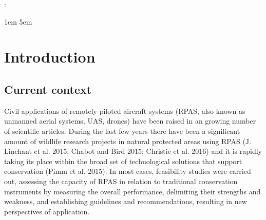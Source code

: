 \documentclass[]{interact}
\theoremstyle{plain}%
\theoremstyle{definition}
\theoremstyle{remark}
\begin{document}
    
 : \par
  \begingroup
  \leftskip1em
  \rightskip\leftskip
  \rightskip5em
  \par
  \endgroup
  \vspace{5mm}


% 

\vskip 6.5pt

\noindent  \section{Introduction}\label{introduction}

\subsection{Current context}\label{current-context}

Civil applications of remotely piloted aircraft systems (RPAS, also
known as unmanned aerial systems, UAS, drones) have been raised in an
growing number of scientific articles. During the last few years there
have been a significant amount of wildlife research projects in natural
protected areas using RPAS (J. Linchant et al. 2015; Chabot and Bird
2015; Christie et al. 2016) and it is rapidly taking its place within
the broad set of technological solutions that support conservation (Pimm
et al. 2015). In most cases, feasibility studies were carried out,
assessing the capacity of RPAS in relation to traditional conservation
instruments by measuring the overall performance, delimiting their
strengths and weakness, and establishing guidelines and recommendations,
resulting in new perspectives of application.
\end{document}
